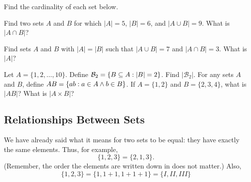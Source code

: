 \documentclass[12pt]{article}
\begin{document}
\begin{activity}
\begin{questions}
\question Find the cardinality of each set below.

\question Find two sets $A$ and $B$ for which $|A| = 5$, $|B| = 6$, and $|A\cup B| = 9$.  What is $|A \cap B|$?

\question Find sets $A$ and $B$ with $|A| = |B|$ such that $|A\cup B| = 7$ and $|A \cap B| = 3$.  What is $|A|$?

\question Let $A = \{1,2,\ldots, 10\}$.  Define $\mathcal{B}_2 = \{B \subseteq A : |B| = 2\}$.  Find $|\mathcal{B}_2|$.
\question For any sets $A$ and $B$, define $AB = \{ab : a\in A \wedge b \in B\}$.  If $A = \{1,2\}$ and $B = \{2,3,4\}$, what is $|AB|$?  What is $|A \times B|$?
\end{questions}
\end{activity}



\subsection{Relationships Between Sets}

We have already said what it means for two sets to be equal: they have exactly the same elements.  Thus, for example,
\[ \{1, 2, 3\} = \{2, 1, 3\}.\]
(Remember, the order the elements are written down in does not matter.)  Also,
\[ \{1, 2, 3\} = \{1, 1+1, 1+1+1\} = \{I, II, III\}\]
\end{document}
